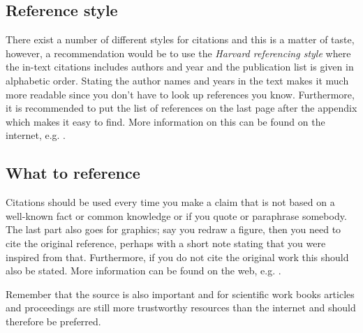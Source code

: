 \subsection{Reference style}
There exist a number of different styles for citations and this is a matter of taste, however, a recommendation would be to use the \emph{Harvard referencing style} where the in-text citations includes authors and year and the publication list is given in alphabetic order. Stating the author names and years in the text makes it much more readable since you don't have to look up references you know. Furthermore, it is recommended to put the list of references on the last page after the appendix which makes it easy to find. More information on this can be found on the internet, e.g. \citep{hawardStyleOnline}.

\subsection{What to reference}
Citations should be used every time you make a claim that is not based on a well-known fact or common knowledge or if you quote or paraphrase somebody. The last part also goes for graphics; say you redraw a figure, then you need to cite the original reference, perhaps with a short note stating that you were inspired from that. Furthermore, if you do not cite the original work this should also be stated. More information can be found on the web, e.g.  \citep{PrincestonWhenToCite}.

Remember that the source is also important and for scientific work books articles and proceedings are still more trustworthy resources than the internet and should therefore be preferred.

